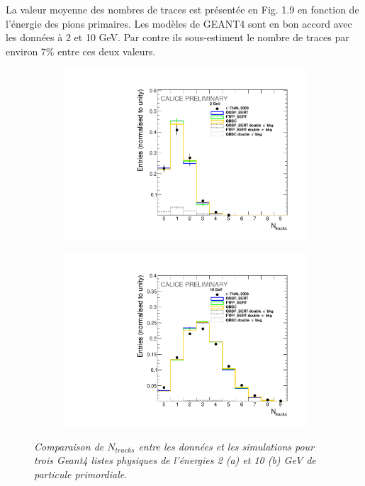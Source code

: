 La valeur moyenne des nombres de traces est présentée en Fig. 1.9 en fonction de l'énergie des pions primaires. Les modèles de GEANT4 sont en bon accord avec les données à 2 et 10 GeV. Par contre ils sous-estiment le nombre de traces par environ 7\% entre ces deux valeurs.   

\begin{figure}
	\centering
	\begin{subfigure}{0.5\textwidth}
		\centering
		\includegraphics[width=.90\linewidth]{ECAL/plots/ntracks-2.pdf}
		\caption{\label{fig:tr2F} }
	\end{subfigure}%
	\begin{subfigure}{0.5\textwidth}
		\centering
		\includegraphics[width=.90\linewidth]{ECAL/plots/ntracks-10.pdf}
		\caption{\label{fig:tr10F} }
	\end{subfigure}
	\caption{\label{fig:NtrackF} \sl Comparaison de $N_{tracks}$ entre les données et les simulations pour trois {\sc Geant}4  listes physiques de l'\'energies 2 (a) et 10 (b) GeV de particule primordiale.}
\end{figure}

